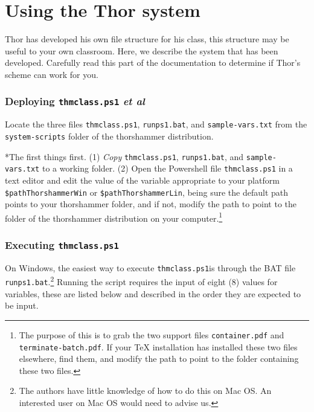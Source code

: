 \documentclass{article}
\makeatletter
\let\partSave\part
\def\part#1{\par\addvspace{4ex}\bgroup\let\newpage\relax\partSave{#1}\egroup\addvspace{2ex}}
\let\pkg\textsf
\let\app\textsf
\def\thescript{\texttt{thmclass.ps1}}
\def\thebatch{\texttt{runps1.bat}}
\renewcommand{\paragraph}
    {\@startsection{paragraph}{4}{0pt}{6pt}{-3pt}{\bfseries}}
\makeatother
\begin{document}
\part{Using the Thor system}\label{PartI}

\noindent Thor has developed his own file structure for his class, this
structure may be useful to your own classroom. Here, we describe the system
that has been developed. Carefully read this part of the documentation to
determine if Thor's scheme can work for you. \medskip

\section{Deploying {\thescript} \textsl{et al}}

Locate the three files \thescript, \thebatch, and \texttt{sample-vars.txt}
from the \texttt{system-scripts} folder of the
\pkg{thorshammer} distribution.

\paragraph*{The first things first.} (1) \emph{Copy}
\thescript, \thebatch, and \texttt{sample-vars.txt} to a
working folder.  (2) Open the \app{Powershell} file \thescript{}
in a text editor and edit the value of the variable appropriate to your platform
\texttt{\$pathThorshammerWin} or \texttt{\$pathThorshammerLin},
being sure the default path points to your \pkg{thorshammer}
folder, and if not, modify the path to point to the folder
of the \pkg{thorshammer} distribution on your computer.\footnote{The purpose of this is to
grab the two support files \texttt{container.pdf} and
\texttt{terminate-batch.pdf}. If your {\TeX} installation has
installed these two files elsewhere, find them, and modify the
path to point to the folder containing these two files.}

\section{Executing \thescript}

On \app{Windows}, the easiest way to execute \thescript\space is
through the BAT file \thebatch.\footnote{The authors have little
knowledge of how to do this on \app{Mac OS}. An interested user
on \app{Mac OS} would need to advise us.} Running the script
requires the input of eight (8) values for variables, these are
listed below and described in the order they are expected to be
input.
\end{document}

